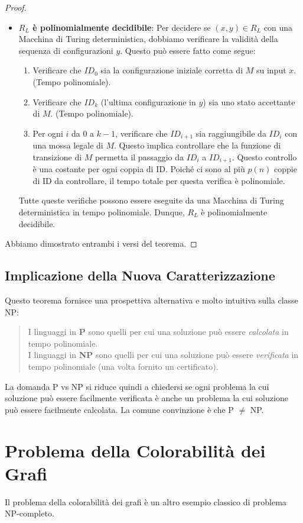 \documentclass[a4paper]{article}
\begin{document}
\begin{proof}
\begin{itemize}
    \item \textbf{$R_L$ è polinomialmente decidibile}:
    Per decidere se $(x, y) \in R_L$ con una Macchina di Turing deterministica, dobbiamo verificare la validità della sequenza di configurazioni $y$. Questo può essere fatto come segue:
    \begin{enumerate}
        \item Verificare che $ID_0$ sia la configurazione iniziale corretta di $M$ su input $x$. (Tempo polinomiale).
        \item Verificare che $ID_k$ (l'ultima configurazione in $y$) sia uno stato accettante di $M$. (Tempo polinomiale).
        \item Per ogni $i$ da $0$ a $k-1$, verificare che $ID_{i+1}$ sia raggiungibile da $ID_i$ con una mossa legale di $M$. Questo implica controllare che la funzione di transizione di $M$ permetta il passaggio da $ID_i$ a $ID_{i+1}$. Questo controllo è una costante per ogni coppia di ID. Poiché ci sono al più $p(n)$ coppie di ID da controllare, il tempo totale per questa verifica è polinomiale.
    \end{enumerate}
    Tutte queste verifiche possono essere eseguite da una Macchina di Turing deterministica in tempo polinomiale. Dunque, $R_L$ è polinomialmente decidibile.
\end{itemize}
Abbiamo dimostrato entrambi i versi del teorema.
\end{proof}

\subsection{Implicazione della Nuova Caratterizzazione}
Questo teorema fornisce una prospettiva alternativa e molto intuitiva sulla classe NP:
\begin{quote}
    I linguaggi in \textbf{P} sono quelli per cui una soluzione può essere \emph{calcolata} in tempo polinomiale. \\
    I linguaggi in \textbf{NP} sono quelli per cui una soluzione può essere \emph{verificata} in tempo polinomiale (una volta fornito un certificato).
\end{quote}
La domanda P vs NP si riduce quindi a chiedersi se ogni problema la cui soluzione può essere facilmente verificata è anche un problema la cui soluzione può essere facilmente calcolata. La comune convinzione è che P $\ne$ NP.

\section{Problema della Colorabilità dei Grafi}
Il problema della colorabilità dei grafi è un altro esempio classico di problema NP-completo.
\end{document}
